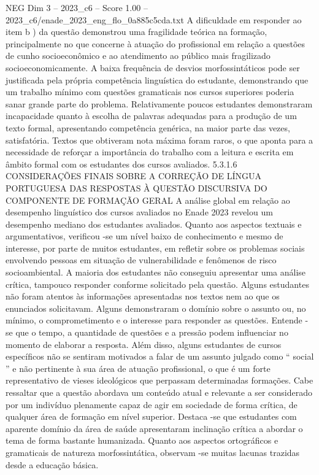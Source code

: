 \begin{textsample}{NEG Dim 3 – 2023\_c6 – Score 1.00 – 2023\_c6/enade\_2023\_eng\_flo\_0a885c5cda.txt}
A dificuldade em responder ao item b ) da questão demonstrou uma fragilidade teórica na formação, principalmente no que concerne à atuação do profissional em relação a questões de cunho socioeconômico e ao atendimento ao público mais fragilizado socioeconomicamente.
A baixa frequência de desvios morfossintáticos pode ser justificada pela própria competência linguística do estudante, demonstrando que um trabalho mínimo com questões gramaticais nos cursos superiores poderia sanar grande parte do problema.
Relativamente poucos estudantes demonstraram incapacidade quanto à escolha de palavras adequadas para a produção de um texto formal, apresentando competência genérica, na maior parte das vezes, satisfatória.
Textos que obtiveram nota máxima foram raros, o que aponta para a necessidade de reforçar a importância do trabalho com a leitura e escrita em âmbito formal com os estudantes dos cursos avaliados. 5.3.1.6 CONSIDERAÇÕES FINAIS SOBRE A CORREÇÃO DE LÍNGUA PORTUGUESA DAS RESPOSTAS À QUESTÃO DISCURSIVA DO COMPONENTE DE FORMAÇÃO GERAL A análise global em relação ao desempenho linguístico dos cursos avaliados no Enade 2023 revelou um desempenho mediano dos estudantes avaliados.
Quanto aos aspectos textuais e argumentativos, verificou -se um nível baixo de conhecimento e mesmo de interesse, por parte de muitos estudantes, em refletir sobre os problemas sociais envolvendo pessoas em situação de vulnerabilidade e fenômenos de risco socioambiental.
A maioria dos estudantes não conseguiu apresentar uma análise crítica, tampouco responder conforme solicitado pela questão.
Alguns estudantes não foram atentos às informações apresentadas nos textos nem ao que os enunciados solicitavam.
Alguns demonstraram o domínio sobre o assunto ou, no mínimo, o comprometimento e o interesse para responder as questões.
Entende -se que o tempo, a quantidade de questões e a pressão podem influenciar no momento de elaborar a resposta.
Além disso, alguns estudantes de cursos específicos não se sentiram motivados a falar de um assunto julgado como “ social ” e não pertinente à sua área de atuação profissional, o que é um forte representativo de vieses ideológicos que perpassam determinadas formações.
Cabe ressaltar que a questão abordava um conteúdo atual e relevante a ser considerado por um indivíduo plenamente capaz de agir em sociedade de forma crítica, de qualquer área de formação em nível superior.
Destaca -se que estudantes com aparente domínio da área de saúde apresentaram inclinação crítica a abordar o tema de forma bastante humanizada.
Quanto aos aspectos ortográficos e gramaticais de natureza morfossintática, observam -se muitas lacunas trazidas desde a educação básica.

\end{textsample}
